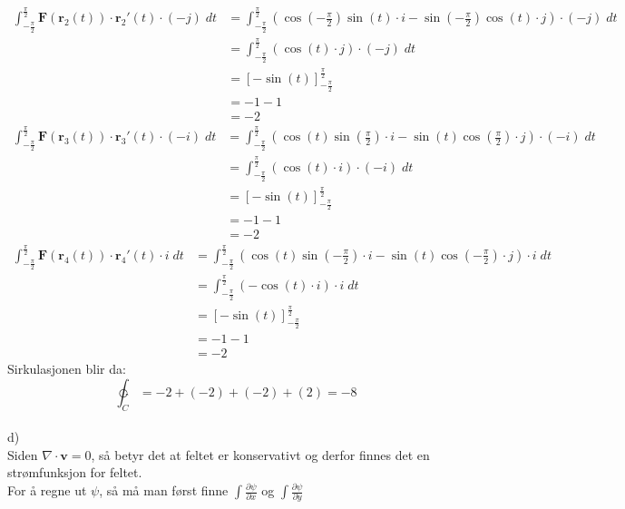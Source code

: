 \documentclass[12pt, a4paper]{article}
\begin{document}
\begin{equation}
    \begin{split}
        \int_{-\frac{\pi}{2}}^{\frac{\pi}{2}} \textbf{F}(\textbf{r}_2(t)) \cdot \textbf{r}_2'(t) \cdot (-j) \; dt &= \int_{-\frac{\pi}{2}}^{\frac{\pi}{2}} (\cos(-\frac{\pi}{2})\sin(t) \cdot i - \sin(-\frac{\pi}{2})\cos(t) \cdot j) \cdot (-j) \; dt \\
        &= \int_{-\frac{\pi}{2}}^{\frac{\pi}{2}} (\cos(t) \cdot j) \cdot (-j) \; dt \\
        &= \left[- \sin(t) \right]_{-\frac{\pi}{2}}^{\frac{\pi}{2}} \\
        &= - 1 - 1 \\
        &= -2
    \end{split}
\end{equation}
\begin{equation}
    \begin{split}
        \int_{-\frac{\pi}{2}}^{\frac{\pi}{2}} \textbf{F}(\textbf{r}_3(t)) \cdot \textbf{r}_3'(t) \cdot (-i) \; dt &= \int_{-\frac{\pi}{2}}^{\frac{\pi}{2}} (\cos(t)\sin\left(\frac{\pi}{2}\right) \cdot i - \sin(t)\cos\left(\frac{\pi}{2}\right) \cdot j) \cdot (-i) \; dt \\
        &= \int_{-\frac{\pi}{2}}^{\frac{\pi}{2}} (\cos(t) \cdot i) \cdot (-i) \; dt \\
        &= \left[- \sin(t) \right]_{-\frac{\pi}{2}}^{\frac{\pi}{2}} \\
        &= - 1 - 1 \\
        &= -2
    \end{split}
\end{equation}
\begin{equation}
    \begin{split}
        \int_{-\frac{\pi}{2}}^{\frac{\pi}{2}} \textbf{F}(\textbf{r}_4(t)) \cdot \textbf{r}_4'(t) \cdot i \; dt &= \int_{-\frac{\pi}{2}}^{\frac{\pi}{2}} (\cos(t)\sin\left(-\frac{\pi}{2}\right) \cdot i - \sin(t)\cos\left(-\frac{\pi}{2}\right) \cdot j) \cdot i \; dt \\
        &= \int_{-\frac{\pi}{2}}^{\frac{\pi}{2}} (- \cos(t) \cdot i) \cdot i \; dt \\
        &= \left[- \sin(t) \right]_{-\frac{\pi}{2}}^{\frac{\pi}{2}} \\
        &= - 1 - 1 \\
        &= -2
    \end{split}
\end{equation}
Sirkulasjonen blir da:
\begin{equation}
    \ointctrclockwise_C = -2 + (-2) + (-2) + (2) = -8
\end{equation}
\\
d) \\
Siden $\nabla \cdot \textbf{v} = 0$, så betyr det at feltet er konservativt og derfor finnes det en strømfunksjon for feltet. \\
For å regne ut $\psi$, så må man først finne $\int \frac{\partial \psi}{\partial x}$ og $\int \frac{\partial \psi}{\partial y}$
\end{document}
